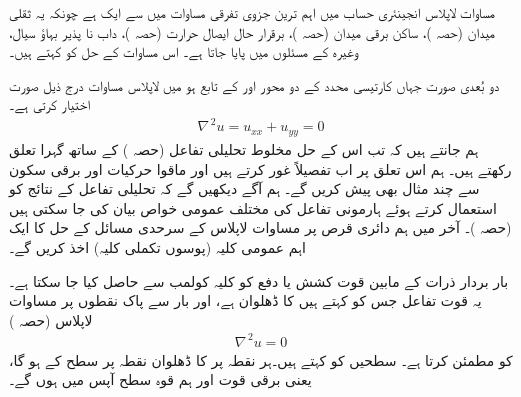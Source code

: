 مساوات لاپلاس  انجینئری حساب میں اہم ترین جزوی تفرقی مساوات میں سے ایک ہے چونکہ  یہ ثقلی میدان (حصہ )، ساکن برقی میدان  (حصہ )، برقرار حال ایصال حرارت (حصہ )، داب نا پذیر بہاؤ سیال، وغیرہ کے مسئلوں میں پایا جاتا ہے۔ اس مساوات کے حل کو  کہتے ہیں۔

دو بُعدی صورت جہاں  کارتیسی محدد کے دو محور  اور  کے تابع ہو میں لاپلاس مساوات درج ذیل صورت اختیار کرتی ہے۔
\begin{align*}
\nabla^{\,2}u=u_{xx}+u_{yy}=0
\end{align*}
ہم جانتے ہیں کہ تب اس کے حل مخلوط تحلیلی تفاعل (حصہ ) کے ساتھ گہرا تعلق رکھتے ہیں۔ ہم اس تعلق پر اب تفصیلاً غور کرتے ہیں اور ماقوا حرکیات اور برقی سکون سے چند مثال بھی پیش کریں گے۔ ہم آگے دیکھیں گے کہ تحلیلی تفاعل کے نتائج کو استعمال کرتے ہوئے ہارمونی تفاعل کی مختلف عمومی خواص  بیان کی جا سکتی ہیں (حصہ )۔ آخر میں ہم دائری قرص پر مساوات لاپلاس کے سرحدی مسائل کے حل کا ایک اہم عمومی کلیہ (پوسوں تکملی کلیہ) اخذ کریں گے۔

بار بردار ذرات کے مابین قوت کشش یا دفع کو کلیہ کولمب سے حاصل  کیا جا سکتا ہے۔یہ قوت تفاعل  جس کو  کہتے ہیں کا ڈھلوان ہے، اور بار سے پاک نقطوں پر  مساوات لاپلاس (حصہ )
\begin{align*}
\nabla^{\,2}u=0
\end{align*}
کو مطمئن کرتا ہے۔ سطحیں  کو  کہتے ہیں۔ہر نقطہ  پر  کا ڈھلوان نقطہ  پر سطح  کے    ہو گا، یعنی برقی قوت اور ہم قوہ سطح آپس میں  ہوں گے۔

